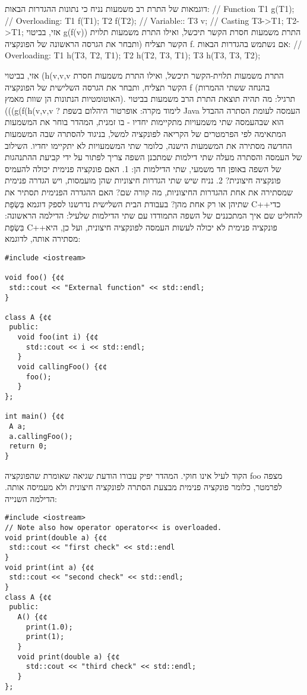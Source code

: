 \begin{טבלא}[!htbp]
      דוגמאות של התרת רב משמעות
      נניח כי נתונות ההגדרות הבאות:
      // Function
      T1 g(T1);
      // Overloading:
      T1 f(T1);
      T2 f(T2);
      // Variable::
      T3 v;
      // Casting
      T3->T1;
      T2->T1;
      אזי, בביטוי
      g(f(v))
      התרת משמעות חסרת הקשר תיכשל, ואילו התרת משמעות תלוית הקשר תצליח (ותבחר את הגרסה הראשונה של הפונקציה f.
      אם נשתמש בהגדרות הבאות:
      // Overloading:
      T1 h(T3, T2, T1);
      T2 h(T2, T3, T1);
      T3 h(T3, T3, T2);

      אזי, בביטוי (h(v,v,v התרת משמעות תלוית-הקשר תיכשל, ואילו התרת משמעות חסרת הקשר תצליח, ותבחר את הגרסה השלישית של הפונקציה f (בהנחה ששתי ההמרות האוטומטיות הנתונות הן שוות מאמץ).
      תרגיל: מה תהיה תוצאת התרת הרב משמעות בביטוי (((g(f(h(v,v,v ?
      לימוד מקרה: אופרטור היהלום בשפת Java
      העמסה לעומת הסתרה
      ההבדל הוא שבהעמסה שתי משמעויות מתקיימות יחדיו - בו זמנית, המהדר בוחר את המשמעות המתאימה לפי הפרמטרים של הקריאה לפונקציה למשל, בניגוד להסתרה שבה המשמעות החדשה מסתירה את המשמעות הישנה, כלומר שתי המשמעויות לא יתקיימו יחדיו.
      השילוב של העמסה והסתרה מעלה שתי דילמות שמתכנן השפה צריך לפתור על ידי קביעת ההתנהגות של השפה באופן חד משמעי, שתי הדילמות הן:
      1. האם פונקציה פנימית יכולה להעמיס פונקציה חיצונית?
      2. נניח שיש שתי הגדרות חיצוניות שהן מועמסות, ויש הגדרה פנימית שמסתירה את אחת ההגדרות החיצוניות, מה קורה שם? האם ההגדרה הפנימית תסתיר את שתיהן או רק אחת מהן?
      בעבודת הבית השלישית נדרשנו לספק דוגמא בִּשְׂפַת C++כדי להחליט שם איך המתכננים של השפה התמודדו עם שתי הדילמות שלעיל:
      הדילמה הראשונה: בִּשְׂפַת C++פונקציה פנימית לא יכולה לעשות העמסה לפונקציה חיצונית, ועל כן, היא מסתירה אותה, לדוגמא:

\begin{verbatim}
#include <iostream>

void foo() {¢¢
 std::cout << "External function" << std::endl;
}

class A {¢¢
 public:
   void foo(int i) {¢¢
     std::cout << i << std::endl;
   }
   void callingFoo() {¢¢
     foo();
   }
};

int main() {¢¢
 A a;
 a.callingFoo();
 return 0;
}
\end{verbatim}

      הקוד לעיל אינו חוקי. המהדר יפיק עבורו הודעת שגיאה שאומרת שהפונקציה foo מצפה לפרמטר, כלומר פונקציה פנימית מבצעת הסתרה לפונקציה חיצונית ולא מעמיסה אותה.
      הדילמה השנייה:
\begin{verbatim}
#include <iostream>
// Note also how operator operator<< is overloaded.
void print(double a) {¢¢
 std::cout << "first check" << std::endl
}
void print(int a) {¢¢
 std::cout << "second check" << std::endl;
}
class A {¢¢
 public:
   A() {¢¢
     print(1.0);
     print(1);
   }
   void print(double a) {¢¢
     std::cout << "third check" << std::endl;
   }
};
\end{verbatim}


\end{טבלא}
